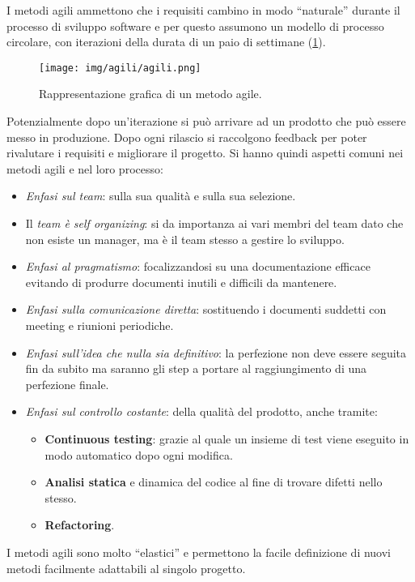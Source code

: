 I metodi agili ammettono che i requisiti cambino in modo “naturale” durante il
processo di sviluppo software e per questo assumono un modello di processo
circolare, con iterazioni della durata di un paio di settimane (\ref{fig:agili}).
\begin{figure}[!ht]
      \centering
      \texttt{[image: img/agili/agili.png]}
      \caption{Rappresentazione grafica di un metodo agile.}
      \label{fig:agili}
\end{figure}
Potenzialmente dopo un'iterazione si può arrivare ad un prodotto che può essere
messo in produzione. Dopo ogni rilascio si raccolgono feedback per poter rivalutare
i requisiti e migliorare il progetto. Si hanno quindi aspetti comuni nei metodi
agili e nel loro processo:
\begin{itemize}
      \item \textit{Enfasi sul team}: sulla sua qualità e sulla sua selezione.
      \item Il \textit{team è self organizing}: si da importanza ai vari membri
            del team dato che non esiste un manager, ma è il team stesso a
            gestire lo sviluppo.
      \item \textit{Enfasi al pragmatismo}: focalizzandosi su una documentazione
            efficace evitando di produrre documenti inutili e difficili da
            mantenere.
      \item \textit{Enfasi sulla comunicazione diretta}: sostituendo i documenti
            suddetti con meeting e riunioni periodiche.
      \item \textit{Enfasi sull'idea che nulla sia definitivo}: la perfezione non
            deve essere seguita fin da subito ma saranno gli step a portare al
            raggiungimento di una perfezione finale.
      \item \textit{Enfasi sul controllo costante}: della qualità del prodotto,
            anche tramite:
            \begin{itemize}
                  \item \textbf{Continuous testing}: grazie al quale un insieme
                        di test viene eseguito in modo automatico dopo ogni modifica.
                  \item \textbf{Analisi statica} e dinamica del codice al fine
                        di trovare difetti nello stesso.
                  \item \textbf{Refactoring}.
            \end{itemize}
\end{itemize}
I metodi agili sono molto “elastici” e permettono la facile definizione di nuovi
metodi facilmente adattabili al singolo progetto.
